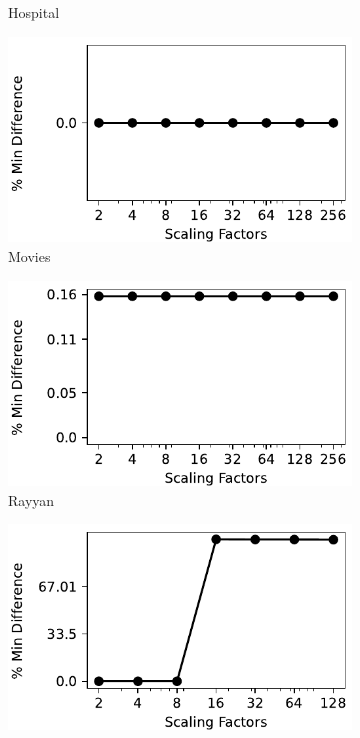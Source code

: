 \begin{figure}[!ht]
\begin{subfigure}{0.32\textwidth}
    \caption{Hospital}
    \label{fig:min_hospitals}
\end{subfigure}
\hfill
\begin{subfigure}{0.32\textwidth}
    \includegraphics[width=\textwidth]{figures/plot/min/min_diff_movies.pdf}
    \caption{Movies}
    \label{exp:min_movies}
\end{subfigure}
\hfill
\begin{subfigure}{0.32\textwidth}
    \includegraphics[width=\textwidth]{figures/plot/min/min_diff_rayyan.pdf}
    \caption{Rayyan}
    \label{exp:min_rayyan}
\end{subfigure}
\hfill
\begin{subfigure}{0.32\textwidth}
    \includegraphics[width=\textwidth]{figures/plot/min/min_diff_tax.pdf}

\end{subfigure}
\end{figure}
